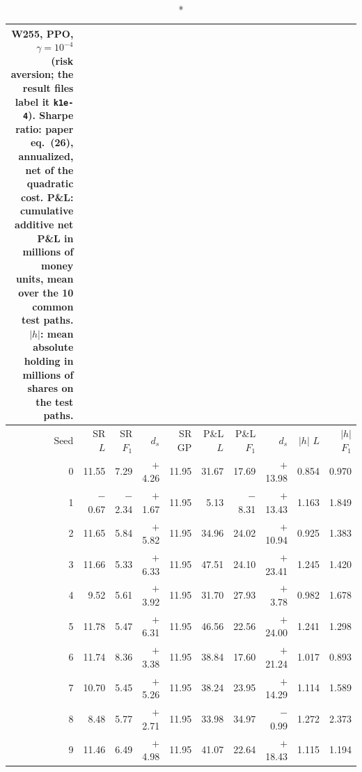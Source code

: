 \begin{longtable}{@{}rrrrrrrrrr@{}}
\caption*{\small W255, PPO, $\gamma = 10^{-4}$ (risk aversion; the result files label it \texttt{k1e-4}). Sharpe ratio: paper eq.\ (26), annualized, net of the quadratic cost. P\&L: cumulative additive net P\&L in millions of money units, mean over the 10 common test paths. $|h|$: mean absolute holding in millions of shares on the test paths.}\\
\toprule
Seed & SR $L$ & SR $F_1$ & $d_s$ & SR GP & P\&L $L$ & P\&L $F_1$ & $d_s$ & $|h|$ $L$ & $|h|$ $F_1$\\ \midrule\endhead
0 & 11.55 & 7.29 & $+$4.26 & 11.95 & 31.67 & 17.69 & $+$13.98 & 0.854 & 0.970\\
1 & $-$0.67 & $-$2.34 & $+$1.67 & 11.95 & 5.13 & $-$8.31 & $+$13.43 & 1.163 & 1.849\\
2 & 11.65 & 5.84 & $+$5.82 & 11.95 & 34.96 & 24.02 & $+$10.94 & 0.925 & 1.383\\
3 & 11.66 & 5.33 & $+$6.33 & 11.95 & 47.51 & 24.10 & $+$23.41 & 1.245 & 1.420\\
4 & 9.52 & 5.61 & $+$3.92 & 11.95 & 31.70 & 27.93 & $+$3.78 & 0.982 & 1.678\\
5 & 11.78 & 5.47 & $+$6.31 & 11.95 & 46.56 & 22.56 & $+$24.00 & 1.241 & 1.298\\
6 & 11.74 & 8.36 & $+$3.38 & 11.95 & 38.84 & 17.60 & $+$21.24 & 1.017 & 0.893\\
7 & 10.70 & 5.45 & $+$5.26 & 11.95 & 38.24 & 23.95 & $+$14.29 & 1.114 & 1.589\\
8 & 8.48 & 5.77 & $+$2.71 & 11.95 & 33.98 & 34.97 & $-$0.99 & 1.272 & 2.373\\
9 & 11.46 & 6.49 & $+$4.98 & 11.95 & 41.07 & 22.64 & $+$18.43 & 1.115 & 1.194\\
\bottomrule\end{longtable}
